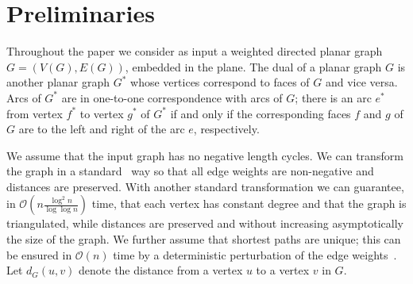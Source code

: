 \documentclass[11pt]{article}
\newcommand{\cO}{\mathcal{O}}
\newcommand{\cOtilde}{\tilde{\cO}}
\begin{document}
%
%
% 
%

\section{Preliminaries} \label{sec:prelim}

Throughout the paper we consider as input a weighted directed planar graph $G=(V(G),E(G))$, embedded in the plane.
The dual of a planar graph $G$ is another planar graph $G^*$ whose vertices correspond to faces of $G$ and
vice versa. Arcs of $G^*$ are in one-to-one correspondence with arcs of $G$; 
there is an arc $e^*$ from vertex $f^*$ to vertex $g^*$ of $G^*$
if and only if the corresponding faces $f$ and $g$ of $G$ are to the left and right of the arc $e$, respectively.


We assume that the input graph has no negative length cycles.
We can transform the graph in a standard~\cite{DBLP:conf/esa/MozesW10} way so that all edge weights are non-negative and distances are preserved.
With another standard transformation we can guarantee, in $\cO(n \frac{\log^2 n}{\log \log n})$ time, that each vertex has constant degree and that the graph is triangulated, while distances are preserved and without increasing asymptotically the size of the graph.
We further assume that shortest paths are unique; this can be ensured in $\cO(n)$ time by a deterministic perturbation of the edge weights~\cite{DBLP:conf/stoc/0001FL18}.
Let $d_G(u,v)$ denote the distance from a vertex $u$ to a vertex $v$ in $G$.
\end{document}
